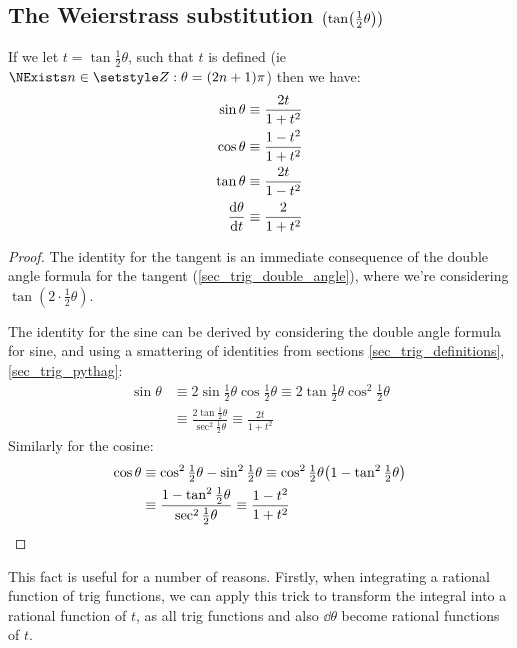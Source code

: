 \subsection[The Weierstrass substitution
            \texorpdfstring{(\(\tan(\theta / 2)\))}{(tangent half-angle)}]
   {The Weierstrass substitution \boldmath\(\pqty{\tan(\tfrac 12 \theta)}\)}

\begin{theorem}
If we let \(t = \tan \tfrac 12 \theta\), such that \(t\) is defined (ie
\(\NExists n \in \Integers: \theta = (2n + 1)\pi\)) then we have:
\begin{align*}
\sin \theta &\equiv \dfrac{2t}{1 + t^2} \\
\cos \theta &\equiv \dfrac{1 - t^2}{1 + t^2} \\
\tan \theta &\equiv \dfrac{2t}{1 - t^2} \\
\dv{\theta}{t} &\equiv \dfrac 2{1 + t^2}
\end{align*}
\end{theorem}
\begin{proof}
The identity for the tangent is an immediate consequence of the double
angle formula for the tangent (\ref{sec_trig_double_angle}), where we're
considering \(\tan{(2 \cdot \frac 12 \theta)}\).

The identity for the sine can be derived by considering the double angle
formula for sine, and using a smattering of identities from sections
\ref{sec_trig_definitions}, \ref{sec_trig_pythag}:
\begin{align*}
\sin \theta &\equiv 2\sin \tfrac 12 \theta \cos\tfrac 12 \theta
    \equiv 2\tan \tfrac 12 \theta \cos^2 \tfrac 12 \theta \\
    &\equiv \frac{2\tan \tfrac 12 \theta}{\sec^2 \tfrac 12 \theta}
    \equiv \frac{2t}{1 + t^2}
\end{align*}
Similarly for the cosine:
\begin{align*}
\cos \theta
    &\equiv \cos^2 \tfrac 12 \theta - \sin^2 \tfrac 12 \theta
    \equiv \cos^2 \tfrac 12 \theta
        \pqty{1 - \tan^2 \tfrac 12 \theta} \\
    &\equiv \frac{1 - \tan^2 \tfrac 12 \theta}
                 {\sec^2 \tfrac 12 \theta}
    \equiv \frac{1 - t^2}{1 + t^2} \qedhere
\end{align*}
\end{proof}

This fact is useful for a number of reasons. Firstly, when integrating a
rational function of trig functions, we can apply this trick to transform
the integral into a rational function of \(t\), as all trig functions and
also \(\dd{\theta}\) become rational functions of \(t\).

